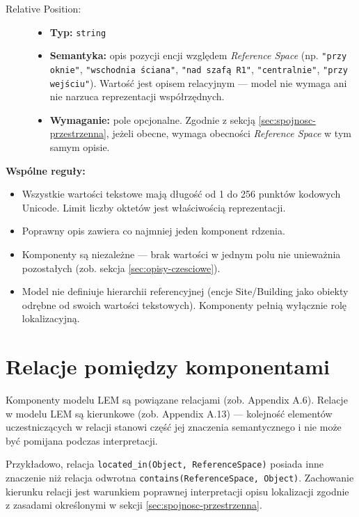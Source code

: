 \begin{description}
    \item[Relative Position:]
    \begin{itemize}
        \item \textbf{Typ:} \texttt{string}
        \item \textbf{Semantyka:} opis pozycji encji względem \textit{Reference Space} (np. \texttt{"przy oknie"}, \texttt{"wschodnia ściana"}, \texttt{"nad szafą R1"}, \texttt{"centralnie"}, \texttt{"przy wejściu"}). Wartość jest opisem relacyjnym --- model nie wymaga ani nie narzuca reprezentacji współrzędnych.
        \item \textbf{Wymaganie:} pole opcjonalne. Zgodnie z sekcją \ref{sec:spojnosc-przestrzenna}, jeżeli obecne, wymaga obecności \textit{Reference Space} w tym samym opisie.
    \end{itemize}
\end{description}

\noindent \textbf{Wspólne reguły:}
\begin{itemize}
    \item Wszystkie wartości tekstowe mają długość od 1 do 256 punktów kodowych Unicode. Limit liczby oktetów jest właściwością reprezentacji.
    \item Poprawny opis zawiera co najmniej jeden komponent rdzenia.
    \item Komponenty są niezależne --- brak wartości w jednym polu nie unieważnia pozostałych (zob. sekcja \ref{sec:opisy-czesciowe}).
    \item Model nie definiuje hierarchii referencyjnej (encje Site/Building jako obiekty odrębne od swoich wartości tekstowych). Komponenty pełnią wyłącznie rolę lokalizacyjną.
\end{itemize}

\section{Relacje pomiędzy komponentami}
\label{sec:relacje}
Komponenty modelu LEM są powiązane relacjami (zob. Appendix A.6). Relacje w modelu LEM są kierunkowe (zob. Appendix A.13) --- kolejność elementów uczestniczących w relacji stanowi część jej znaczenia semantycznego i nie może być pomijana podczas interpretacji.

Przykładowo, relacja \texttt{located\_in(Object, ReferenceSpace)} posiada inne znaczenie niż relacja odwrotna \texttt{contains(ReferenceSpace, Object)}. Zachowanie kierunku relacji jest warunkiem poprawnej interpretacji opisu lokalizacji zgodnie z zasadami określonymi w sekcji \ref{sec:spojnosc-przestrzenna}.

